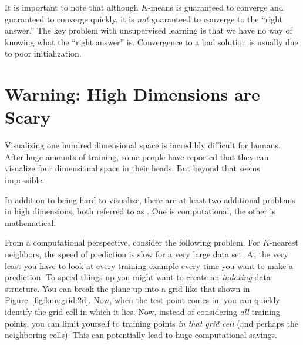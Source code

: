 
It is important to note that although $K$-means is guaranteed to
converge and guaranteed to converge quickly, it is \emph{not}
guaranteed to converge to the ``right answer.''  The key problem with
unsupervised learning is that we have no way of knowing what the
``right answer'' is.  Convergence to a bad solution is usually due to
poor initialization.


\section{Warning: High Dimensions are Scary}

Visualizing one hundred dimensional space is incredibly difficult for
humans.  After huge amounts of training, some people have reported
that they can visualize four dimensional space in their heads.  But
beyond that seems impossible.

In addition to being hard to visualize, there are at least two
additional problems in high dimensions, both referred to as
.  One is computational, the
other is mathematical.


From a computational perspective, consider the following problem.
For $K$-nearest neighbors, the speed of prediction is slow for a very
large data set.  At the very least you have to look at every training
example every time you want to make a prediction.  To speed things up
you might want to create an \emph{indexing} data structure.  You can
break the plane up into a grid like that shown in
Figure~\ref{fig:knn:grid:2d}.  Now, when the test point comes in, you can
quickly identify the grid cell in which it lies.  Now, instead of
considering \emph{all} training points, you can limit yourself to
training points \emph{in that grid cell} (and perhaps the neighboring
cells).  This can potentially lead to huge computational savings.


